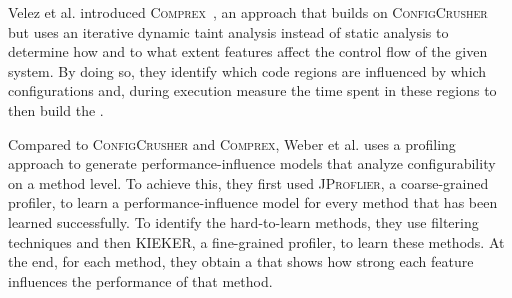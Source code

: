 Velez et al. introduced \textsc{Comprex}~\cite{Comprex}, an approach that builds on \textsc{ConfigCrusher} 
but uses an iterative dynamic taint analysis instead of static analysis to determine how and to what extent features affect the control flow of the given system.
By doing so, they identify which code regions are influenced by which configurations and, during execution measure the time spent in these regions to then build 
the {\perfInfluenceModel}.

Compared to \textsc{ConfigCrusher} and \textsc{Comprex}, Weber et al. 
\cite{White-box-Profiling} uses a profiling approach to generate performance-influence models that analyze configurability on a method level. 
To achieve this, they first used \textsc{JProflier}, a coarse-grained profiler, 
to learn a performance-influence model for every method that has been learned successfully. To identify the hard-to-learn methods, 
they use filtering techniques and then \textsc{KIEKER}, a fine-grained profiler, to learn these methods. At the end, for each method, they
obtain a {\perfInfluenceModel} that shows how strong each feature influences the performance of that method.
